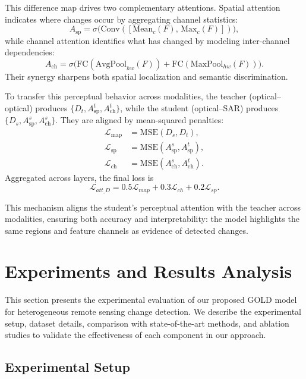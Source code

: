 \documentclass[a4paper,fleqn]{cas-dc}
\begin{document}
This difference map drives two complementary attentions. Spatial attention indicates where changes occur by aggregating channel statistics:
\begin{equation}
A_{\mathrm{sp}}=\sigma\!\big(\mathrm{Conv}([\mathrm{Mean}_c(F),\,\mathrm{Max}_c(F)])\big),
\end{equation}
while channel attention identifies what has changed by modeling inter-channel dependencies:
\begin{equation}
A_{\mathrm{ch}}=\sigma\!\big(\mathrm{FC}(\mathrm{AvgPool}_{hw}(F))+\mathrm{FC}(\mathrm{MaxPool}_{hw}(F))\big).
\end{equation}
Their synergy sharpens both spatial localization and semantic discrimination.  

To transfer this perceptual behavior across modalities, the teacher (optical–optical) produces $\{D_t,A_{\mathrm{sp}}^{t},A_{\mathrm{ch}}^{t}\}$, while the student (optical–SAR) produces $\{D_s,A_{\mathrm{sp}}^{s},A_{\mathrm{ch}}^{s}\}$. They are aligned by mean-squared penalties:
\begin{align}
\mathcal{L}_{\mathrm{map}}&=\mathrm{MSE}(D_s,D_t),\\
\mathcal{L}_{\mathrm{sp}}&=\mathrm{MSE}(A_{\mathrm{sp}}^{s},A_{\mathrm{sp}}^{t}),\\
\mathcal{L}_{\mathrm{ch}}&=\mathrm{MSE}(A_{\mathrm{ch}}^{s},A_{\mathrm{ch}}^{t}).
\end{align}
Aggregated across layers, the final loss is
\begin{equation}
\mathcal{L}_{att\_D} = 0.5 \mathcal{L}_{map}+0.3 \mathcal{L}_{ch}+0.2 \mathcal{L}_{sp}.
\end{equation}

This mechanism aligns the student’s perceptual attention with the teacher across modalities, ensuring both accuracy and interpretability: the model highlights the same regions and feature channels as evidence of detected changes.


\section{Experiments and Results Analysis}
This section presents the experimental evaluation of our proposed GOLD model for heterogeneous remote sensing change detection. We describe the experimental setup, dataset details, comparison with state-of-the-art methods, and ablation studies to validate the effectiveness of each component in our approach.

\subsection{Experimental Setup}
\end{document}
